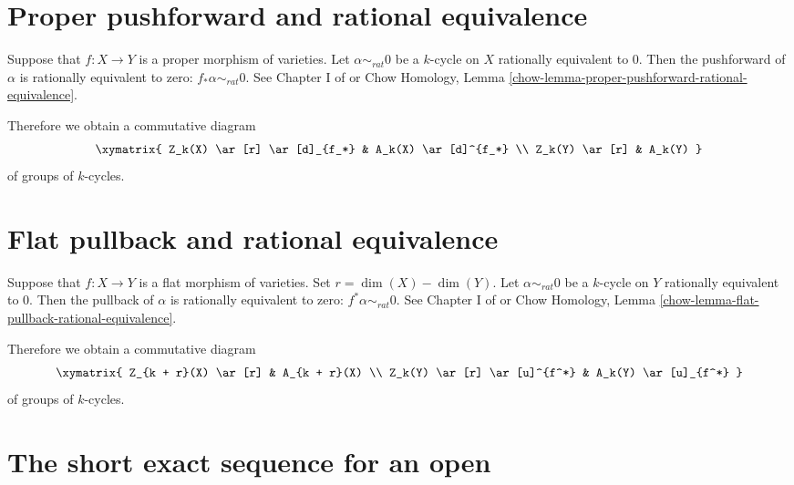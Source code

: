 \section{Proper pushforward and rational equivalence}
\label{section-pushforward-and-rational-equivalence}

\noindent
Suppose that $f : X \to Y$ is a proper morphism of varieties.
Let $\alpha \sim_{rat} 0$ be a $k$-cycle on
$X$ rationally equivalent to $0$. Then the {pushforward}
of $\alpha$ is rationally equivalent to zero:
$f_* \alpha \sim_{rat} 0$. See Chapter I of \cite{F} or
Chow Homology, Lemma \ref{chow-lemma-proper-pushforward-rational-equivalence}.

\medskip\noindent
Therefore we obtain a commutative diagram
$$
\xymatrix{
Z_k(X) \ar[r] \ar[d]_{f_*} & A_k(X) \ar[d]^{f_*} \\
Z_k(Y) \ar[r] & A_k(Y)
}
$$
of groups of $k$-cycles.


\section{Flat pullback and rational equivalence}
\label{section-flat-pullback-and-rational-equivalence}

\noindent
Suppose that $f : X \to Y$ is a flat morphism of varieties.
Set $r = \dim(X) - \dim(Y)$.
Let $\alpha \sim_{rat} 0$ be a $k$-cycle on
$Y$ rationally equivalent to $0$. Then the pullback
of $\alpha$ is rationally equivalent to zero:
$f^* \alpha \sim_{rat} 0$. See Chapter I of \cite{F} or
Chow Homology, Lemma \ref{chow-lemma-flat-pullback-rational-equivalence}.

\medskip\noindent
Therefore we obtain a commutative diagram
$$
\xymatrix{
Z_{k + r}(X) \ar[r] & A_{k + r}(X) \\
Z_k(Y) \ar[r] \ar[u]^{f^*} & A_k(Y) \ar[u]_{f^*}
}
$$
of groups of $k$-cycles.


\section{The short exact sequence for an open}
\label{section-ses}

